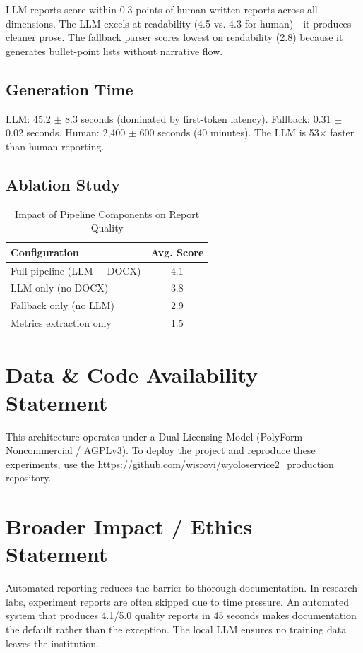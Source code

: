 \documentclass[10pt,twocolumn,letterpaper]{article}
\begin{document}
LLM reports score within 0.3 points of human-written reports across all dimensions. The LLM excels at readability (4.5 vs. 4.3 for human)---it produces cleaner prose. The fallback parser scores lowest on readability (2.8) because it generates bullet-point lists without narrative flow.

\subsection{Generation Time}
LLM: 45.2 $\pm$ 8.3 seconds (dominated by first-token latency). Fallback: 0.31 $\pm$ 0.02 seconds. Human: 2,400 $\pm$ 600 seconds (40 minutes). The LLM is 53$\times$ faster than human reporting.

\subsection{Ablation Study}
\begin{table}[htbp]
\centering
\caption{Impact of Pipeline Components on Report Quality}
\label{tab:ablation}
\begin{tabular}{@{}lc@{}}
\toprule
\textbf{Configuration} & \textbf{Avg. Score} \\
\midrule
Full pipeline (LLM + DOCX) & 4.1 \\
LLM only (no DOCX) & 3.8 \\
Fallback only (no LLM) & 2.9 \\
Metrics extraction only & 1.5 \\
\bottomrule
\end{tabular}
\end{table}

\section{Data \& Code Availability Statement}
This architecture operates under a Dual Licensing Model (PolyForm Noncommercial / AGPLv3). To deploy the project and reproduce these experiments, use the \url{https://github.com/wisrovi/wyoloservice2\_production} repository.

\section{Broader Impact / Ethics Statement}
Automated reporting reduces the barrier to thorough documentation. In research labs, experiment reports are often skipped due to time pressure. An automated system that produces 4.1/5.0 quality reports in 45 seconds makes documentation the default rather than the exception. The local LLM ensures no training data leaves the institution.
\end{document}

